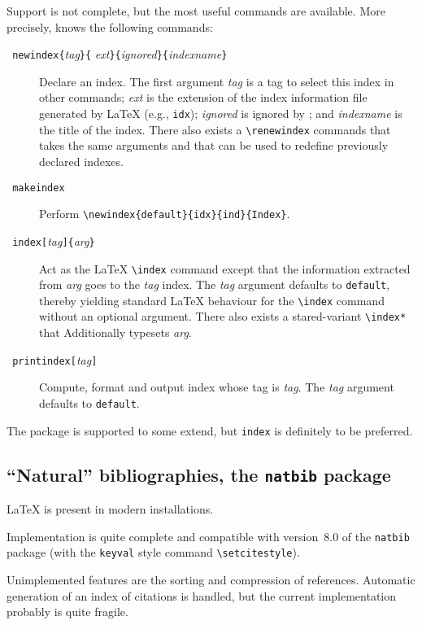 Support is not complete, but the most useful commands are available.
More precisely, \hevea{} knows the following commands:
\begin{description}
\item[{\tt{} newindex\{}{\it tag}{\tt \}\{}{\it
ext}{\tt\}\{}{\it ignored}{\tt\}\{}{\it indexname}{\tt\}}]
Declare an index.
The first argument {\it tag} is a tag to select this index in other
commands; {\it ext} is the extension of the index information file
generated by \LaTeX{} (e.g., \texttt{idx}); {\it ignored} is ignored by
\hevea{}; and {\it indexname} is the title of the index.
There also exists a
\verb+\renewindex+ commands that takes the same arguments and that can be
used to redefine previously declared indexes.
\item[{\tt{} makeindex}] Perform
\verb+\newindex{default}{idx}{ind}{Index}+.
\item[{\tt{} index[}{\it tag}{\tt]\{}{\it arg}{\tt\}}]
Act as the \LaTeX{} \verb+\index+ command except that the information
extracted from {\it arg} goes to the {\it tag} index.
The {\it tag} argument defaults to \verb+default+, thereby yielding
standard \LaTeX{} behaviour for the \verb+\index+ command without an
optional argument.
There also exists a stared-variant \verb+\index*+ that Additionally
typesets {\it arg}.
\item[{\tt{} printindex[}{\it tag}{\tt]}] Compute, format and
output index whose tag is \textit{tag}. The {\it tag} argument
defaults to \verb+default+.
\end{description}

The  package is
supported to some extend, but \texttt{index} is definitely to be
preferred.

\subsection{``Natural'' bibliographies, the \texttt{natbib} package }
\LaTeX{} 
is present in modern installations.

Implementation is quite complete and compatible
with version~8.0 of the \texttt{natbib} package
(with the \texttt{keyval} style command \verb+\setcitestyle+).

Unimplemented features are the sorting and compression of references.
Automatic generation of an index of citations is handled, but
the current implementation probably is quite fragile.

